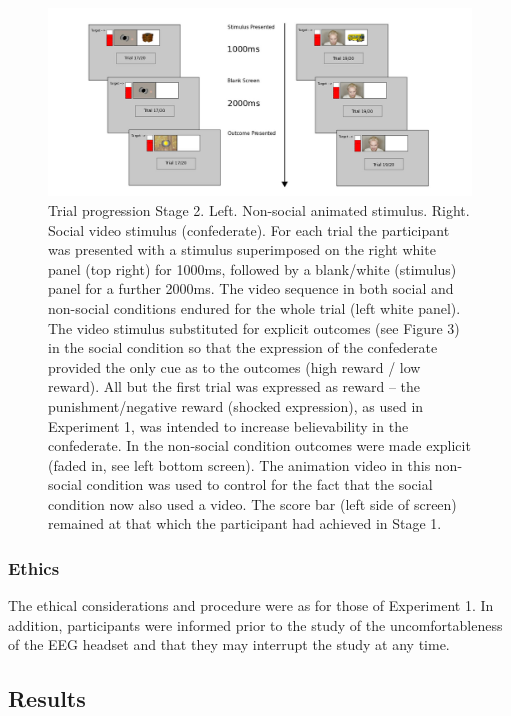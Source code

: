 \documentclass[]{elsarticle} %
\begin{document}
\begin{figure}

{\centering \includegraphics[width=1\linewidth]{figure8} 

}

\caption{Trial progression Stage 2. Left. Non-social animated stimulus. Right. Social video stimulus (confederate). For each trial the participant was presented with a stimulus superimposed on the right white panel (top right) for 1000ms, followed by a blank/white (stimulus) panel for a further 2000ms. The video sequence in both social and non-social conditions endured for the whole trial (left white panel). The video stimulus substituted for explicit outcomes (see Figure 3) in the social condition so that the expression of the confederate provided the only cue as to the outcomes (high reward / low reward). All but the first trial was expressed as reward – the punishment/negative reward (shocked expression), as used in Experiment 1, was intended to increase believability in the confederate. In the non-social condition outcomes were made explicit (faded in, see left bottom screen). The animation video in this non-social condition was used to control for the fact that the social condition now also used a video. The score bar (left side of screen) remained at that which the participant had achieved in Stage 1.}\label{fig:figure7}
\end{figure}

\hypertarget{ethics-1}{%
\subsubsection{Ethics}\label{ethics-1}}

The ethical considerations and procedure were as for those of Experiment
1. In addition, participants were informed prior to the study of the
uncomfortableness of the EEG headset and that they may interrupt the
study at any time.

\hypertarget{results-1}{%
\subsection{Results}\label{results-1}}
\end{document}
